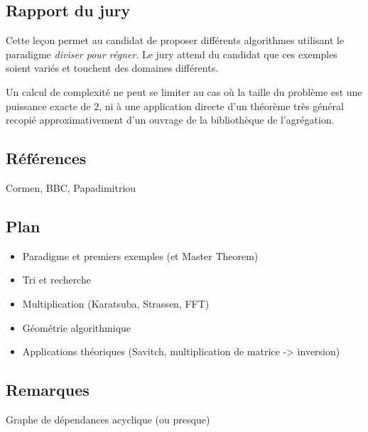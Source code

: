 \documentclass[../../agregation.tex]{subfiles}
\begin{document}

\subsection{Rapport du jury}

\begin{aquote}{}
Cette leçon permet au candidat de proposer différents algorithmes utilisant le paradigme \emph{diviser pour régner}. Le jury attend du candidat que ces exemples soient variés et touchent des domaines différents.

Un calcul de complexité ne peut se limiter au cas où la taille du problème est une puissance exacte de 2, ni à une application directe d'un théorème très général recopié approximativement d'un ouvrage de la bibliothèque de l'agrégation.
\end{aquote}

\dvts

\subsection{Références}

Cormen, BBC, Papadimitriou

\subsection{Plan}

\begin{itemize}
	\item Paradigme et premiers exemples (et Master Theorem)
	\item Tri et recherche
	\item Multiplication (Karatsuba, Strassen, FFT)
	\item Géométrie algorithmique
	\item Applications théoriques (Savitch, multiplication de matrice -> inversion)
\end{itemize}

\subsection{Remarques}

Graphe de dépendances acyclique (ou presque)
\end{document}
